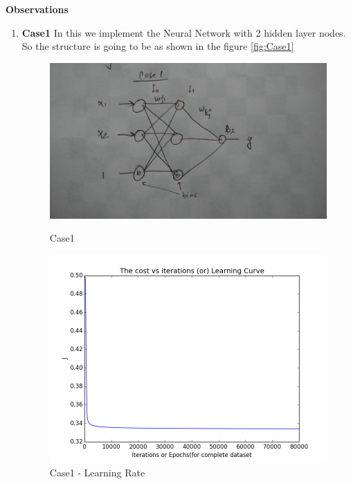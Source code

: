 \documentclass[10pt, letterpaper]{article}
\begin{document}
\textbf{Observations}
\begin{enumerate}
\item \textbf{Case1} In this we implement the Neural Network with 2 hidden layer nodes. So the structure is going to be as shown in the figure \ref{fig:Case1}
\begin{figure}[h!]
\centering
\includegraphics[scale=0.1]{case1.jpg}
\caption{Case1}
\label{fig:Case1}

\centering
\includegraphics[scale=0.5]{3_3_1_learning.png}
\caption{Case1 - Learning Rate}
\label{fig:LR1}


\end{figure}
\end{enumerate}
\end{document}
